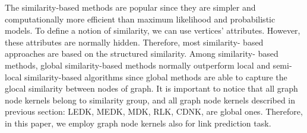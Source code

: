 The similarity-based methods are popular since they are simpler and
computationally more efficient than maximum likelihood and probabilistic
models. To define a notion of similarity, we can use vertices' attributes.
However, these attributes are normally hidden. Therefore, most similarity-
based approaches are based on the structured similarity. Among similarity-
based methods, global similarity-based methods normally outperform local and
semi-local similarity-based algorithms since global methods are able to
capture the glocal similarity between nodes of graph. It is important to
notice that all graph node kernels belong to similarity group, and all graph
node kernels described in previous section: LEDK, MEDK, MDK, RLK, CDNK, are
global ones. Therefore, in this paper, we employ graph node kernels also for
link prediction task.
